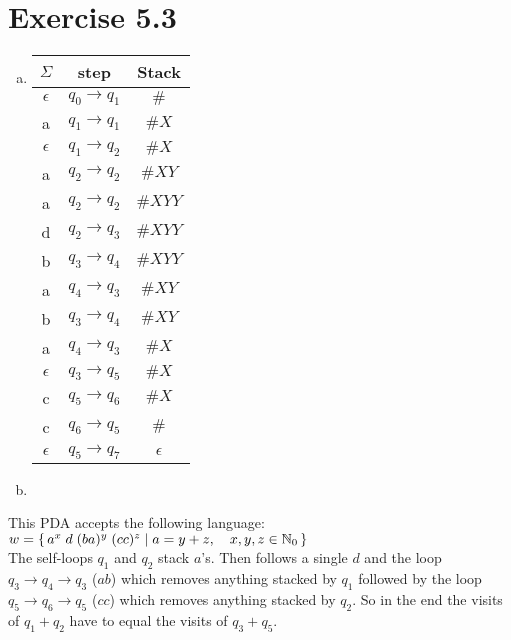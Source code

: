 \documentclass{article} %
\newcommand{\homeworkNumber}{5}
\begin{document}
\section*{Exercise \homeworkNumber.3}
\begin{enumerate}[(a)]
	\item
	\renewcommand{\arraystretch}{1.25}
	\begin{tabular}{ c | c | c }
	$\Sigma$ & step & Stack\\
	\hline
	$\epsilon$ & $q_0 \to q_1$ & $\#$\\
	a & $q_1 \to q_1$ & $\#X$\\
	$\epsilon$ & $q_1 \to q_2$ & $\#X$\\
	a & $q_2 \to q_2$ & $\#XY$\\
	a & $q_2 \to q_2$ & $\#XYY$\\
	d & $q_2 \to q_3$ & $\#XYY$\\
	b & $q_3 \to q_4$ & $\#XYY$\\
	a & $q_4 \to q_3$ & $\#XY$\\
	b & $q_3 \to q_4$ & $\#XY$\\
	a & $q_4 \to q_3$ & $\#X$\\
	$\epsilon$ & $q_3 \to q_5$ & $\#X$\\
	c & $q_5 \to q_6$ & $\#X$\\
	c & $q_6 \to q_5$ & $\#$\\
	$\epsilon$ & $q_5 \to q_7$ & $\epsilon$\\
	\end{tabular}
	
	\item
	\end{enumerate}
	This PDA accepts the following language: 
	$w = \set{a^x \; d \; (ba)^y \; (cc)^z \mid a = y+z,\quad x,y,z \in \mathbb{N}_0}$\\
	The self-loops $q_1$ and $q_2$ stack $a$'s. Then follows a single $d$ and the loop $q_3 \to q_4 \to q_3$ ($ab$) which removes anything stacked by $q_1$ followed by the loop $q_5 \to q_6 \to q_5$ ($cc$) which removes anything stacked by $q_2$. So in the end the visits of $q_1 + q_2$ have to equal the visits of $q_3 + q_5$.
\end{document}
